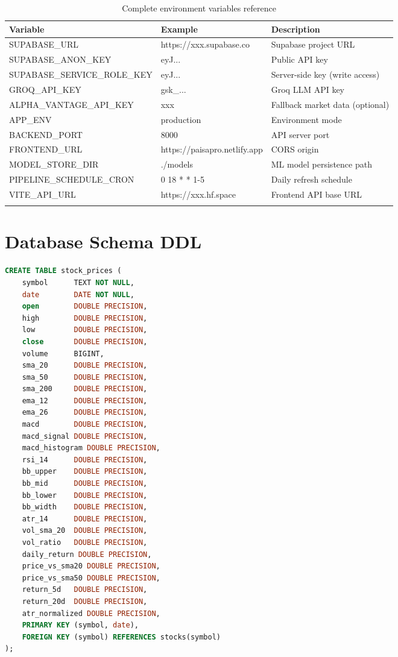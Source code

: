 \documentclass[12pt, a4paper, oneside]{report}
\begin{document}
\begin{appendices}
\begin{longtable}{@{}l p{4cm} p{6cm}@{}}
\toprule
\textbf{Variable} & \textbf{Example} & \textbf{Description} \\
\midrule
\endhead
SUPABASE\_URL & https://xxx.supabase.co & Supabase project URL \\
SUPABASE\_ANON\_KEY & eyJ... & Public API key \\
SUPABASE\_SERVICE\_ROLE\_KEY & eyJ... & Server-side key (write access) \\
GROQ\_API\_KEY & gsk\_... & Groq LLM API key \\
ALPHA\_VANTAGE\_API\_KEY & xxx & Fallback market data (optional) \\
APP\_ENV & production & Environment mode \\
BACKEND\_PORT & 8000 & API server port \\
FRONTEND\_URL & https://paisapro.netlify.app & CORS origin \\
MODEL\_STORE\_DIR & ./models & ML model persistence path \\
PIPELINE\_SCHEDULE\_CRON & 0 18 * * 1-5 & Daily refresh schedule \\
VITE\_API\_URL & https://xxx.hf.space & Frontend API base URL \\
\bottomrule
\caption{Complete environment variables reference}
\label{tab:env_vars}
\end{longtable}


\chapter{Database Schema DDL}
\label{app:ddl}

\begin{lstlisting}[style=pythonstyle, caption={stock\_prices table DDL}, label={lst:ddl_prices}, language=SQL]
CREATE TABLE stock_prices (
    symbol      TEXT NOT NULL,
    date        DATE NOT NULL,
    open        DOUBLE PRECISION,
    high        DOUBLE PRECISION,
    low         DOUBLE PRECISION,
    close       DOUBLE PRECISION,
    volume      BIGINT,
    sma_20      DOUBLE PRECISION,
    sma_50      DOUBLE PRECISION,
    sma_200     DOUBLE PRECISION,
    ema_12      DOUBLE PRECISION,
    ema_26      DOUBLE PRECISION,
    macd        DOUBLE PRECISION,
    macd_signal DOUBLE PRECISION,
    macd_histogram DOUBLE PRECISION,
    rsi_14      DOUBLE PRECISION,
    bb_upper    DOUBLE PRECISION,
    bb_mid      DOUBLE PRECISION,
    bb_lower    DOUBLE PRECISION,
    bb_width    DOUBLE PRECISION,
    atr_14      DOUBLE PRECISION,
    vol_sma_20  DOUBLE PRECISION,
    vol_ratio   DOUBLE PRECISION,
    daily_return DOUBLE PRECISION,
    price_vs_sma20 DOUBLE PRECISION,
    price_vs_sma50 DOUBLE PRECISION,
    return_5d   DOUBLE PRECISION,
    return_20d  DOUBLE PRECISION,
    atr_normalized DOUBLE PRECISION,
    PRIMARY KEY (symbol, date),
    FOREIGN KEY (symbol) REFERENCES stocks(symbol)
);


\end{lstlisting}
\end{appendices}
\end{document}
